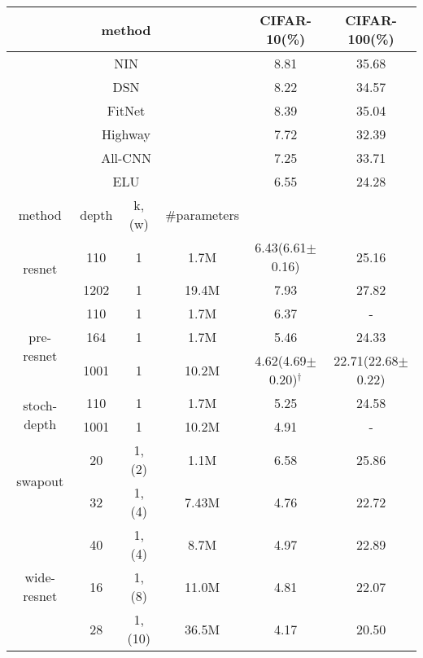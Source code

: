 \documentclass[journal]{IEEEtran}
\begin{document}
\begin{table*}[!htp]
\centering
\begin{tabular}{||c c c c|c |c||} 
\hline
\multicolumn{4}{||c|}{method} & CIFAR-10(\%) & CIFAR-100(\%)\\
\hline
\hline
\multicolumn{4}{||c|}{NIN\cite{lin2013network}} & 8.81 & 35.68\\
\multicolumn{4}{||c|}{DSN\cite{lee2015deeply}} & 8.22 & 34.57\\
\multicolumn{4}{||c|}{FitNet\cite{romero2014fitnets}} & 8.39 & 35.04\\
\multicolumn{4}{||c|}{Highway\cite{srivastava2015training}} & 7.72 & 32.39\\
\multicolumn{4}{||c|}{All-CNN\cite{springenberg2014striving}} & 7.25 & 33.71\\
\multicolumn{4}{||c|}{ELU\cite{clevert2015fast}} & 6.55 & 24.28\\

\hline
\hline
method & depth & k,(w) & \#parameters & &  \\
\hline
\hline

\multirow{2}{8em}{resnet\cite{he2015deep}} 
& 110 & 1 & 1.7M & 6.43\tiny(6.61$\pm$0.16) & 25.16 \\ 
& 1202 & 1 & 19.4M & 7.93 & 27.82 \\ 
\hline
\multirow{3}{8em}{pre-resnet\cite{he2016identity}} 
& 110 & 1& 1.7M & 6.37 & - \\ 
& 164 & 1& 1.7M & 5.46 & 24.33 \\ 
& 1001 & 1& 10.2M & 4.62\tiny(4.69$\pm$0.20)$^\dagger$ & 22.71\tiny(22.68$\pm$0.22) \\ 
\hline
\multirow{2}{8em}{stoch-depth\cite{huang2016deep}} 
& 110 & 1 & 1.7M & 5.25 & 24.58 \\ 
& 1001 & 1 & 10.2M & 4.91 & - \\ 
\hline
\multirow{2}{8em}{swapout\cite{singh2016swapout}} 
& 20 & 1,(2) & 1.1M & 6.58 & 25.86 \\ 

& 32 & 1,(4) & 7.43M & 4.76 & 22.72 \\ 
\hline
\multirow{3}{8em}{wide-resnet\cite{zagoruyko2016wide}} 
& 40 & 1,(4) & 8.7M & 4.97 & 22.89 \\ 
& 16 & 1,(8) & 11.0M & 4.81 & 22.07 \\ 
& 28 & 1,(10) & 36.5M & 4.17 & 20.50 \\ 


\end{tabular}
\end{table*}
\end{document}
